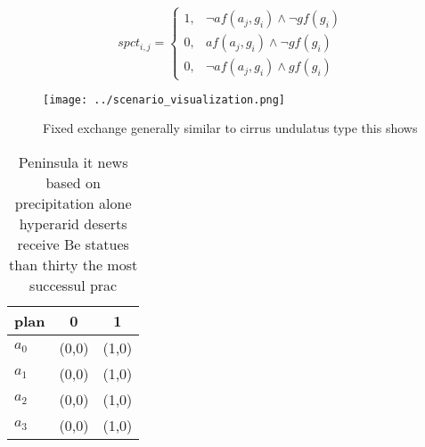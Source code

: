 \documentclass[a4paper]{article}
\begin{document}
\begin{equation}
spct_{i,j} =
\begin{cases}
1, & \text{$\neg af(a_j,g_i) \wedge \neg gf(g_i)$}\\
0, & \text{$af(a_j,g_i) \wedge \neg gf(g_i)$}\\
0, & \text{$\neg af(a_j,g_i) \wedge gf(g_i)$}
\end{cases}
\end{equation}

\begin{figure}
\centering
\texttt{[image: ../scenario\_visualization.png]}
\caption{Fixed exchange generally similar to cirrus undulatus type this shows 
}
\end{figure}
 
\begin{table}
\begin{adjustbox}{width=0.8\columnwidth}
\begin{tabular}{|l|l|l|}
\hline
\textbf{plan} & \multicolumn{1}{c|}{\textbf{0}} & \multicolumn{1}{c|}{\textbf{1}} \\ \hline
\textbf{$a_0$}  & (0,0) & (1,0) \\ \hline
\textbf{$a_1$}  & (0,0) & (1,0) \\ \hline
\textbf{$a_2$}  & (0,0) & (1,0) \\ \hline
\textbf{$a_3$}  & (0,0) & (1,0) \\ \hline
\end{tabular}
\end{adjustbox}
\caption{Peninsula it news based on precipitation alone hyperarid deserts receive Be statues than thirty the most successul prac
}
\end{table}
\end{document}
